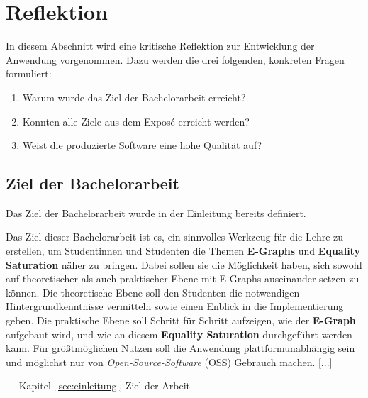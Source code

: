 \section{Reflektion}\label{sec:reflektion}

In diesem Abschnitt wird eine kritische Reflektion zur Entwicklung der Anwendung vorgenommen. Dazu werden die drei folgenden, konkreten Fragen formuliert:

\begin{enumerate}[nolistsep]
    \item Warum wurde das Ziel der Bachelorarbeit erreicht?
    \item Konnten alle Ziele aus dem Exposé erreicht werden? 
    \item Weist die produzierte Software eine hohe Qualität auf?
\end{enumerate}

\subsection{Ziel der Bachelorarbeit}

Das Ziel der Bachelorarbeit wurde in der Einleitung bereits definiert. 

\begin{tcolorbox}[enhanced, frame hidden, borderline west = {1.5pt}{0pt}{gray-700},lower separated=false,fontupper=\sffamily] 
\glqq Das Ziel dieser Bachelorarbeit ist es, ein sinnvolles Werkzeug für die Lehre zu erstellen,
um Studentinnen und Studenten die Themen \textbf{E-Graphs} und \textbf{Equality Saturation} näher zu bringen.
Dabei sollen sie die Möglichkeit haben, sich sowohl auf theoretischer als auch praktischer Ebene mit E-Graphs auseinander setzen zu können.
Die theoretische Ebene soll den Studenten die notwendigen Hintergrundkenntnisse vermitteln sowie einen Enblick in die Implementierung geben.
Die praktische Ebene soll Schritt für Schritt aufzeigen, wie der \textbf{E-Graph} aufgebaut wird, und wie an diesem \textbf{Equality Saturation} durchgeführt werden kann.
Für grö{\ss}tmöglichen Nutzen soll die Anwendung plattformunabhängig sein und möglichst nur von \textit{Open-Source-Software} (OSS) Gebrauch machen. [...]\grqq

\begin{flushright}
    --- Kapitel~\ref{sec:einleitung}, Ziel der Arbeit
\end{flushright}
\end{tcolorbox}






